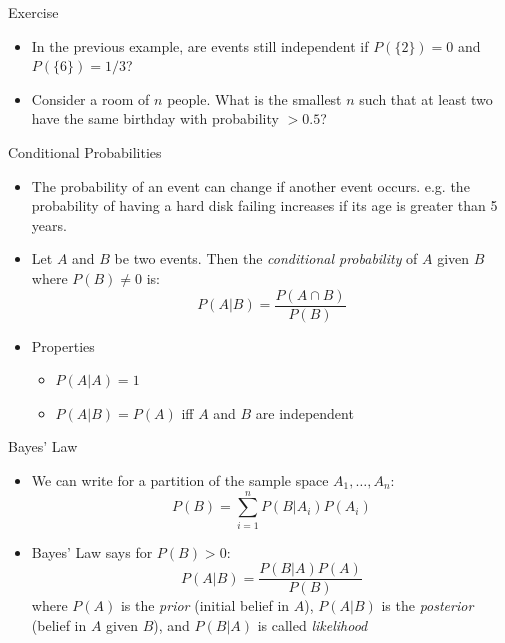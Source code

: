 \documentclass{beamer}
\begin{document}
\begin{frame}{Exercise}
\begin{itemize} 
 \item In the previous example, are events still independent if $P(\{2\}) = 0$ and $P(\{6\}) = 1/3$? 
 \item Consider a room of $n$ people. What is the smallest $n$ such that at least two have the same birthday with probability $> 0.5$? 
\end{itemize}
\end{frame}

\begin{frame}{Conditional Probabilities}
\begin{itemize} 
 \item The probability of an event can change if another event occurs. e.g. the probability of having a hard disk failing increases if its age is greater than 5 years. 
\item Let $A$ and $B$ be two events. Then the \emph{conditional probability} of $A$ given $B$ where $P(B) \neq 0$ is: 
\begin{displaymath} 
 P(A | B) = \frac{P(A \cap B)}{P(B)}
\end{displaymath}
\item Properties 
\begin{itemize}
\item $P(A | A) = 1$
\item $P(A | B) = P(A)$ iff $A$ and $B$ are independent 
\end{itemize}
\end{itemize} 
\end{frame}

\begin{frame}{Bayes' Law} 
\begin{itemize}
 \item We can write for a partition of the sample space $A_1, \ldots, A_n$: 
\begin{displaymath}
 P(B) = \sum_{i=1}^n P(B | A_i) P(A_i)
\end{displaymath}
\item Bayes' Law says for $P(B)>0$: 
\begin{displaymath}
 P(A | B) = \frac{P(B | A)P(A)}{P(B)}
\end{displaymath}
where $P(A)$ is the \emph{prior} (initial belief in $A$), $P(A|B)$ is the \emph{posterior} (belief in $A$ given $B$), and $P(B | A)$ is called \emph{likelihood} 
\end{itemize}
\end{frame}
\end{document}
